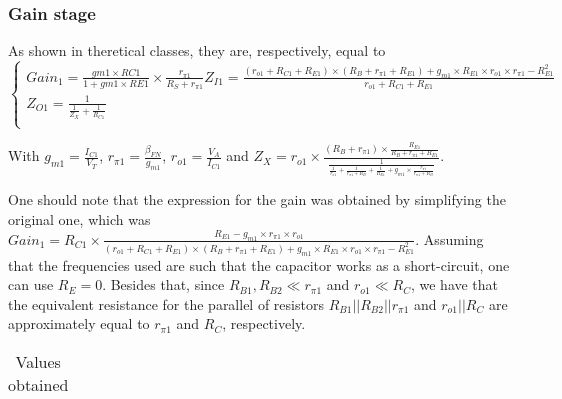 \subsubsection{Gain stage}
As shown in theretical classes, they are, respectively, equal to 
\begin{equation}
\begin{cases}
Gain_1 = \frac{gm1 \times RC1}{1+gm1 \times RE1} \times \frac{r_{\pi1}}{R_S+r_{\pi1}}
Z_{I1} = \frac{(r_{o1}+R_{C1}+R_{E1}) \times (R_B+r_{\pi 1}+R_{E1}) + g_{m1} \times R_{E1} \times r_{o1} \times r_{\pi 1} - R_{E1}^2}{r_{o1} + R_{C1} + R_{E1}} \\ %
Z_{O1} = \frac{1}{\frac{1}{Z_X}+\frac{1}{R_{C1}}} \\ %
\end{cases}
\end{equation}

With $g_{m1}=\frac{I_{C1}}{V_T}$, $r_{\pi 1}=\frac{\beta_{FN}}{g_{m1}}$, $r_{o1}=\frac{V_A}{I_{C1}}$ and $Z_X = r_{o1} \times \frac{(R_B+r_{\pi 1}) \times \frac{R_{E1}}{R_B+r_{\pi 1}+R_{E1}}}{\frac{1}{\frac{1}{r_{o1}}+\frac{1}{r_{\pi 1}+R_B}+\frac{1}{R_{E1}}+ g_{m1} \times \frac{r_{\pi 1}}{r_{\pi 1}+R_B}}}$.


One should note that the expression for the gain was obtained by simplifying the original one, which was $Gain_1 = R_{C1} \times \frac{R_{E1}-g_{m1} \times r_{\pi 1} \times r_{o1}}{(r_{o1}+R_{C1}+R_{E1})\times(R_B+r_{\pi 1}+R_{E1})+g_{m1} \times R_{E1} \times r_{o1} \times r_{\pi 1} - R_{E1}^2}$. Assuming that the frequencies used are such that the capacitor works as a short-circuit, one can use $R_E=0$. Besides that, since $R_{B1}, R_{B2} \ll r_{\pi1}$ and $r_{o1} \ll R_C$, we have that the equivalent resistance for the parallel of resistors $R_{B1} || R_{B2} || r_{\pi1}$ and $r_{o1} || R_C$ are approximately equal to $r_{\pi1}$ and $R_C$, respectively.



\begin{table}[H]
  \centering
  \begin{tabular}{|c|c|}
    \hline
      
  \end{tabular}
  \caption{Values obtained}
  \label{tab:resultsAC1}
\end{table}


